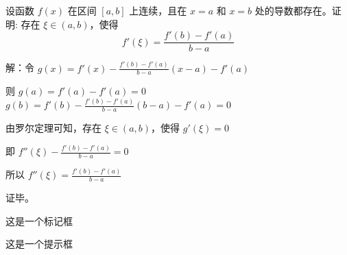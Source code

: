 \begin{quesblock}
    设函数 $f(x)$ 在区间 $[a,b]$ 上连续，且在 $x=a$ 和 $x=b$ 处的导数都存在。证明:
    存在 $\xi \in (a,b)$，使得
    \[
    f'(\xi) = \frac{f'(b) - f'(a)}{b-a}
    \]
\end{quesblock}

\begin{solblock}
解：令 $g(x) = f'(x) - \frac{f'(b)-f'(a)}{b-a}(x-a) - f'(a)$

则 $g(a) = f'(a) - f'(a) = 0$
$g(b) = f'(b) - \frac{f'(b)-f'(a)}{b-a}(b-a) - f'(a) = 0$

由罗尔定理可知，存在 $\xi \in (a,b)$，使得 $g'(\xi) = 0$

即 $f''(\xi) - \frac{f'(b)-f'(a)}{b-a} = 0$

所以 $f''(\xi) = \frac{f'(b)-f'(a)}{b-a}$

证毕。

\end{solblock}



\begin{markerblock}
这是一个标记框
\end{markerblock}

\begin{tipsblock}[title=提示]
    这是一个提示框
\end{tipsblock}   

